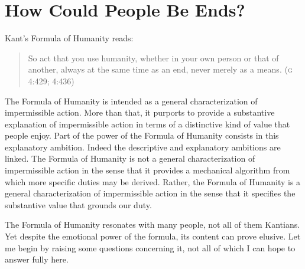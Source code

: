 \documentclass[a4paper,12pt]{article}
\begin{document}

\section{How Could People Be Ends?} \label{sec:how_could_people_be_ends} %

Kant's Formula of Humanity reads: 
\begin{quote}
	So act that you use humanity, whether in your own person or that of another, always at the same time as an end, never merely as a means. (\textsc{g} 4:429; 4:436) 
\end{quote}

The Formula of Humanity is intended as a general characterization of impermissible action. More than that, it purports to provide a substantive explanation of impermissible action in terms of a distinctive kind of value that people enjoy. Part of the power of the Formula of Humanity consists in this explanatory ambition. Indeed the descriptive and explanatory ambitions are linked. The Formula of Humanity is not a general characterization of impermissible action in the sense that it provides a mechanical algorithm from which more specific duties may be derived. Rather, the Formula of Humanity is a general characterization of impermissible action in the sense that it specifies the substantive value that grounds our duty.

The Formula of Humanity resonates with many people, not all of them Kantians. Yet despite the emotional power of the formula, its content can prove elusive. Let me begin by raising some questions concerning it, not all of which I can hope to answer fully here.
\end{document}

